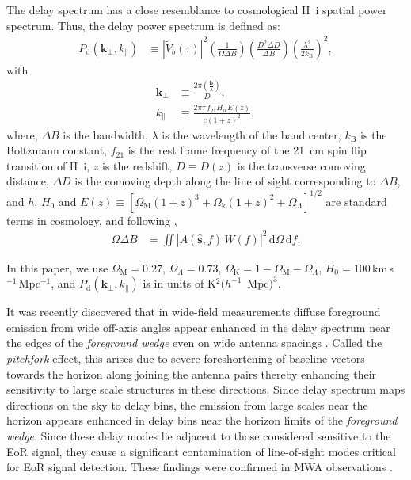\documentclass[preprint2,iop,numberedappendix,twocolappendix,appendixfloats]{emulateapj}
\newcommand{\dif}{\mathrm{d}}
\begin{document}
The delay spectrum has a close resemblance to cosmological H~{\sc i} spatial power spectrum. Thus, the delay power spectrum is defined as:
\begin{align}\label{eqn:delay-power-spectrum}
  P_\textrm{d}(\boldsymbol{k}_\perp,k_\parallel) &\equiv |\tilde{V}_b(\tau)|^2\left(\frac{1}{\Omega\Delta B}\right)\left(\frac{D^2\Delta D}{\Delta B}\right)\left(\frac{\lambda^2}{2k_\textrm{B}}\right)^2,
\end{align}
with
\begin{align}
  \boldsymbol{k}_\perp &\equiv \frac{2\pi(\frac{\boldsymbol{b}}{\lambda})}{D}, \\
  k_\parallel &\equiv \frac{2\pi\tau\,f_{21}H_0\,E(z)}{c(1+z)^2}, 
\end{align}
where, $\Delta B$ is the bandwidth, $\lambda$ is the wavelength of the band center, $k_\textrm{B}$ is the Boltzmann constant, $f_{21}$ is the rest frame frequency of the 21~cm spin flip transition of H~{\sc i}, $z$ is the redshift, $D\equiv D(z)$ is the transverse comoving distance, $\Delta D$ is the comoving depth along the line of sight corresponding to $\Delta B$, and $h$, $H_0$ and $E(z)\equiv [\Omega_\textrm{M}(1+z)^3+\Omega_\textrm{k}(1+z)^2+\Omega_\Lambda]^{1/2}$ are standard terms in cosmology, and following \citet{par14},
\begin{align}
  \Omega\Delta B &= \iint \left|A(\hat{\boldsymbol{s}},f)\,W(f)\right|^2\,\dif\Omega\,\dif f.
\end{align}

In this paper, we use $\Omega_\textrm{M}=0.27$, $\Omega_\Lambda=0.73$, $\Omega_\textrm{K}=1-\Omega_\textrm{M}-\Omega_\Lambda$, $H_0=100\,$km$\,$s$^{-1}\,$Mpc$^{-1}$, and $P_\textrm{d}(\boldsymbol{k}_\perp,k_\parallel)$ is in units of K$^2 (h^{-1}$~Mpc$)^3$.

It was recently discovered that in wide-field measurements diffuse foreground emission from wide off-axis angles appear enhanced in the delay spectrum near the edges of the {\it foreground wedge} even on wide antenna spacings \citep{thy15a}. Called the {\it pitchfork} effect, this arises due to severe foreshortening of baseline vectors towards the horizon along joining the antenna pairs thereby enhancing their sensitivity to large scale structures in these directions. Since delay spectrum maps directions on the sky to delay bins, the emission from large scales near the horizon appears enhanced in delay bins near the horizon limits of the {\it foreground wedge}. Since these delay modes lie adjacent to those considered sensitive to the EoR signal, they cause a significant contamination of line-of-sight modes critical for EoR signal detection. These findings were confirmed in MWA observations \citep{thy15b}.
\end{document}
